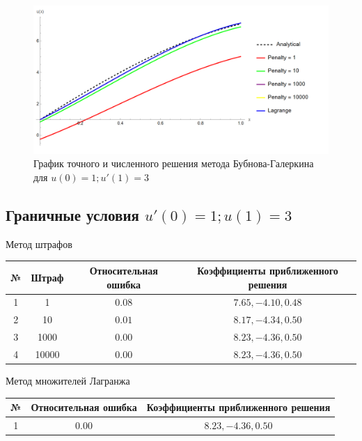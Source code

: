 \documentclass[12pt,a4paper]{article}
\begin{document}
	\begin{figure}[h]
		\centering
		\includegraphics[width=1\textwidth]{m-1-2.PNG}
		\caption{График точного и численного решения метода Бубнова-Галеркина для $u(0) = 1; u'(1) = 3$}
	\end{figure}
	
	
	\subsection{Граничные условия $u'(0) = 1; u(1) = 3$}
	
	    \begin{center}
		Метод штрафов
		\begin{tabular}{|c|c|c|c|} 
			\hline
			№ & Штраф & Относительная ошибка & Коэффициенты приближенного решения \\ 
			\hline
			1 & 1 &$0.08$ & ${7.65,-4.10,0.48}$ \\ 
			\hline
			2 & 10 &$0.01$ & ${8.17,-4.34,0.50}$ \\ 
			\hline
			3 & 1000 &$0.00$ & ${8.23,-4.36,0.50}$ \\ 
			\hline
			4 & 10000 &$0.00$ & ${8.23,-4.36,0.50}$ \\ 
			\hline
		\end{tabular}
	\end{center}
	
	\begin{center}
		Метод множителей Лагранжа
		\begin{tabular}{|c|c|c|} 
			\hline
			№ & Относительная ошибка & Коэффициенты приближенного решения \\ 
			\hline
			1 & $0.00$ & ${8.23,-4.36,0.50}$ \\ 
			\hline
		\end{tabular}
	\end{center}
	
\end{document}
